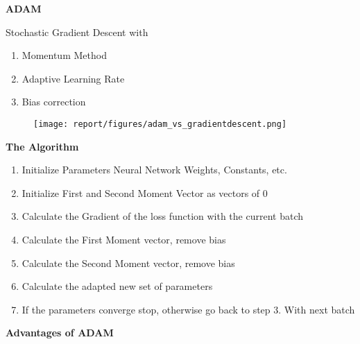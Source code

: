 \documentclass{beamer}
\newcommand\myheading[1]{%
  \par\bigskip
  {\Large\bfseries#1}\par\smallskip}
\begin{document}
\begin{frame}
    \myheading{ADAM}
    Stochastic Gradient Descent with
    \begin{enumerate}
        \item Momentum Method
        \item Adaptive Learning Rate
        \item Bias correction
    \end{enumerate}
    
    \begin{figure}[h]
        \texttt{[image: report/figures/adam\_vs\_gradientdescent.png]}
    \end{figure}
\end{frame}

\begin{frame}
    \myheading{The Algorithm}
    \begin{enumerate}
        \item Initialize Parameters
        Neural Network Weights, Constants, etc.
        \item Initialize First and Second Moment Vector as vectors of 0
        \item Calculate the Gradient of the loss function with the current batch
        \item Calculate the First Moment vector, remove bias
        \item Calculate the Second Moment vector, remove bias
        \item Calculate the adapted new set of parameters
        \item If the parameters converge stop, otherwise go back to step 3. With next batch
    \end{enumerate}
\end{frame}




\begin{frame}
    \myheading{Advantages of ADAM}
\end{frame}
\end{document}
